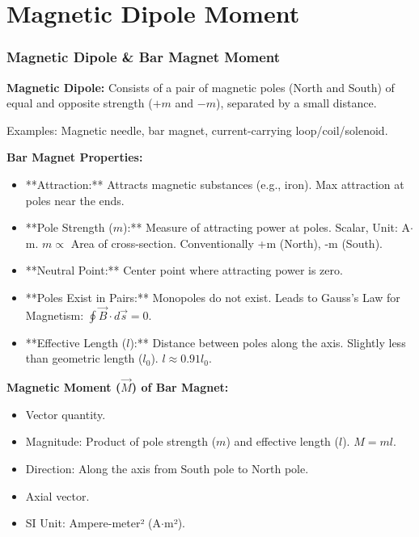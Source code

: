 \section{Magnetic Dipole Moment}

\transfade[duration=0.5]

\begin{frame}[t]
    \frametitle{\textcolor{deepnavy}{\textbf{Magnetic Dipole & Bar Magnet Moment}}}
    \renewcommand{\familydefault}{\rmdefault}
    \small

      \item<+-> \textbf{Magnetic Dipole:} Consists of a pair of magnetic poles (North and South) of equal and opposite strength ($+m$ and $-m$), separated by a small distance.
      \item<+-> Examples: Magnetic needle, bar magnet, current-carrying loop/coil/solenoid.

    \item<+-> \textbf{Bar Magnet Properties:}
        \begin{itemize}[<+->]
              \item **Attraction:** Attracts magnetic substances (e.g., iron).   Max attraction at poles near the ends.
            \item **Pole Strength ($m$):** Measure of attracting power at poles.   Scalar, Unit: A$\cdot$m.   $m \propto$ Area of cross-section.   Conventionally +m (North), -m (South).
              \item **Neutral Point:** Center point where attracting power is zero.
              \item **Poles Exist in Pairs:** Monopoles do not exist.   Leads to Gauss's Law for Magnetism: $\oint \vec{B} \cdot d\vec{s} = 0$.
            \item **Effective Length ($l$):** Distance between poles along the axis. Slightly less than geometric length ($l_0$).   $l \approx 0.91 l_0$.
        \end{itemize}

      \item<+-> \textbf{Magnetic Moment ($\vec{M}$) of Bar Magnet:}
        \begin{itemize}[<+->]
              \item Vector quantity.
            \item Magnitude: Product of pole strength ($m$) and effective length ($l$).   $M = ml$.
              \item Direction: Along the axis from South pole to North pole.
              \item Axial vector.
              \item SI Unit: Ampere-meter² (A$\cdot$m²).
        \end{itemize}
\end{frame}

